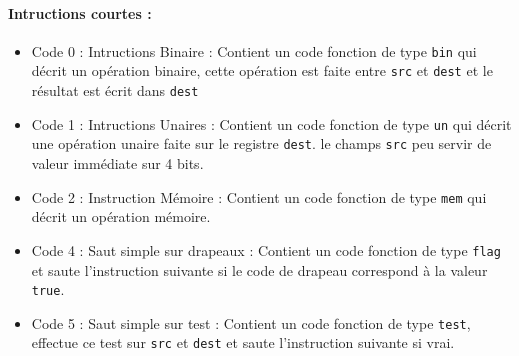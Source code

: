 \documentclass[12pt]{article}
\begin{document}
\paragraph{Intructions courtes :}
\begin{itemize}
\item Code 0 : Intructions Binaire : Contient un code fonction de type
  \verb!bin! qui décrit un opération binaire, cette opération est faite entre
  \verb!src! et \verb!dest! et le résultat est écrit dans \verb!dest!
\item Code 1 : Intructions Unaires : Contient un code fonction de type \verb!un!
  qui décrit une opération unaire faite sur le registre \verb!dest!. le champs \verb!src!
  peu servir de valeur immédiate sur 4 bits.
\item Code 2 : Instruction Mémoire : Contient un code fonction de type
  \verb!mem! qui décrit un opération mémoire.
\item Code 4 : Saut simple sur drapeaux  : Contient un code fonction de type \verb!flag!
  et saute l'instruction suivante si le code de drapeau correspond à la valeur
  \verb!true!.
\item Code 5 : Saut simple sur test : Contient un code fonction de type
  \verb!test!, effectue ce test sur \verb!src! et \verb!dest! et saute
  l'instruction suivante si vrai.
\end{itemize}
\end{document}
